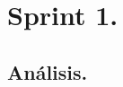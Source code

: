 \documentclass[12pt, a4paper, titlepage]{report}
\begin{document}

    \part{Sprint 1.}
    
	\chapter{\textcolor{azulescom}{Análisis.}}
	    
\end{document}
